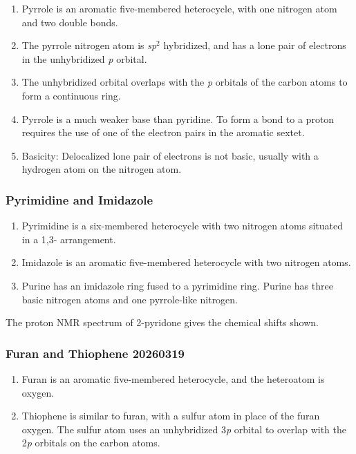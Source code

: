 \begin{enumerate}
    \item Pyrrole is an aromatic five-membered heterocycle, with one nitrogen atom and two double bonds.
    \item The pyrrole nitrogen atom is \textit{sp}$^2$ hybridized, and has a lone pair of electrons in the unhybridized \textit{p} orbital.
    \item The unhybridized orbital overlaps with the \textit{p} orbitals of the carbon atoms to form a continuous ring.
    \item Pyrrole is a much weaker base than pyridine. To form a bond to a proton requires the use of one of the electron pairs in the aromatic sextet.
    \item Basicity: Delocalized lone pair of electrons is not basic, usually with a hydrogen atom on the nitrogen atom.
\end{enumerate}

\subsubsection{Pyrimidine and Imidazole}

\begin{enumerate}
    \item Pyrimidine is a six-membered heterocycle with two nitrogen atoms situated in a 1,3- arrangement.
    \item Imidazole is an aromatic five-membered heterocycle with two nitrogen atoms.
    \item Purine has an imidazole ring fused to a pyrimidine ring. Purine has three basic nitrogen atoms and one pyrrole-like nitrogen.
\end{enumerate}

\begin{example} %
    The proton NMR spectrum of 2-pyridone gives the chemical shifts shown.
\end{example}

\subsubsection{Furan and Thiophene 20260319}

\begin{enumerate}
    \item Furan is an aromatic five-membered heterocycle, and the heteroatom is oxygen.
    \item Thiophene is similar to furan, with a sulfur atom in place of the furan oxygen. The sulfur atom uses an unhybridized 3\textit{p} orbital to overlap with the 2\textit{p} orbitals on the carbon atoms.
\end{enumerate}

